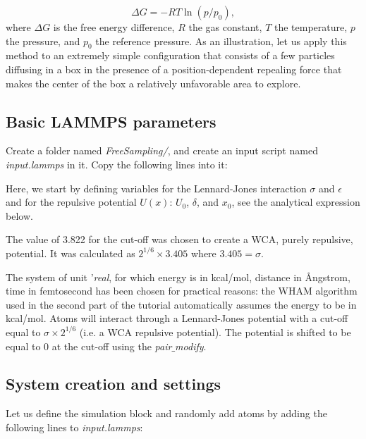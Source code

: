 $$\Delta G = -RT \ln(p/p_0),$$
where $\Delta G$ is the free energy difference,
$R$ the gas constant,
$T$ the temperature, 
$p$ the pressure,
and $p_0$ the reference pressure.
As an illustration, let us apply this method to an
extremely simple configuration that consists of a few
particles diffusing in a box in the presence of a position-dependent
repealing force that makes the center
of the box a relatively unfavorable area to explore.

\subsection{Basic LAMMPS parameters}
\noindent Create a folder named \textit{FreeSampling/}, and create an input script
named \textit{input.lammps} in it. Copy the following lines into it:


\noindent Here, we start by defining variables for the Lennard-Jones
interaction $\sigma$ and $\epsilon$ and for
the repulsive potential $U (x)$: $U_0$, $\delta$, and $x_0$, 
see the analytical expression below.

\vspace{0.25cm} \noindent The value of 3.822 for the cut-off was chosen to 
create a WCA, purely repulsive, potential. It was calculated
as $2^{1/6} $ where
$3.405 = \sigma$.

\vspace{0.25cm} \noindent The system of unit '\textit{real}, for which energy is in kcal/mol, distance in Ångstrom,
time in femtosecond has been chosen for practical reasons:
the WHAM algorithm used in the second
part of the tutorial automatically assumes the energy to
be in kcal/mol. Atoms will interact through a
Lennard-Jones potential with a cut-off equal to 
$\sigma {} ^ {1/6}$ (i.e. a WCA repulsive
potential). The potential is shifted to be equal to 0 at
the cut-off using the \textit{pair$\_$modify}.

\subsection{System creation and settings}
\noindent Let us define the simulation block and randomly add atoms
by adding the following lines to \textit{input.lammps}:

